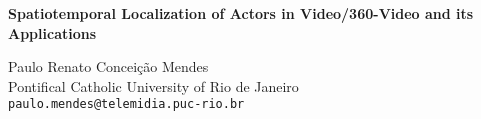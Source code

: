 \documentclass[11pt]{article}
\begin{document}
\LARGE


\begin{center}
{\bf Spatiotemporal Localization of Actors   in Video/360-Video and its Applications}
\end{center}


\bigskip
\normalsize

\begin{flushright}

Paulo Renato Conceição Mendes\\
Pontifical Catholic University of Rio de Janeiro\\
\texttt{paulo.mendes@telemidia.puc-rio.br}
\end{flushright}


\date{}


\thispagestyle{empty}

%
%

{} \setcounter{page}{-1}

\tableofcontents

\newpage
{} \setcounter{page}{1}








\newpage


% 

\end{document}
